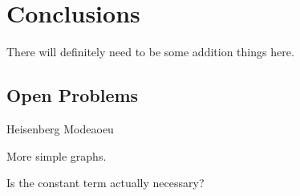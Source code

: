 \documentclass[../thesis-main/thesis-main]{subfiles}
\begin{document}
 
\chapter{Conclusions}
There will definitely need to be some addition things here.
\section{Open Problems}

Heisenberg Modeaoeu

More simple graphs.

Is the constant term actually necessary?
\end{document}
